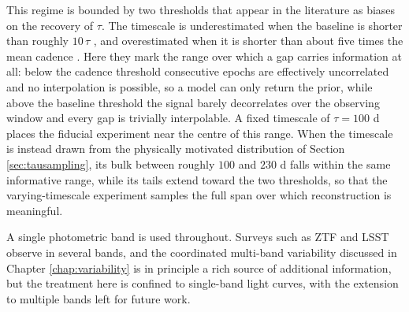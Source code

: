 This regime is bounded by two thresholds that appear in the literature as biases on the recovery of $\tau$. The timescale is underestimated when the baseline is shorter than roughly $10\,\tau$ \parencite{Kozlowski2016LimitationsOT}, and overestimated when it is shorter than about five times the mean cadence \parencite{Hu2024TauBias}. Here they mark the range over which a gap carries information at all: below the cadence threshold consecutive epochs are effectively uncorrelated and no interpolation is possible, so a model can only return the prior, while above the baseline threshold the signal barely decorrelates over the observing window and every gap is trivially interpolable. A fixed timescale of $\tau = 100$ d places the fiducial experiment near the centre of this range. When the timescale is instead drawn from the physically motivated distribution of Section \ref{sec:tausampling}, its bulk between roughly $100$ and $230$ d falls within the same informative range, while its tails extend toward the two thresholds, so that the varying-timescale experiment samples the full span over which reconstruction is meaningful.

A single photometric band is used throughout. Surveys such as ZTF and LSST observe in several bands, and the coordinated multi-band variability discussed in Chapter \ref{chap:variability} is in principle a rich source of additional information, but the treatment here is confined to single-band light curves, with the extension to multiple bands left for future work.